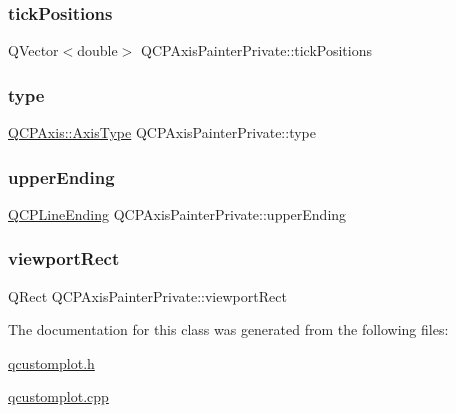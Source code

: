 \subsubsection{\texorpdfstring{tick\+Positions}{tickPositions}}
{\footnotesize\ttfamily Q\+Vector$<$double$>$ Q\+C\+P\+Axis\+Painter\+Private\+::tick\+Positions}

\mbox{\label{class_q_c_p_axis_painter_private_ae04594e97417336933d807c86d353098}} 
\subsubsection{\texorpdfstring{type}{type}}
{\footnotesize\ttfamily \hyperlink{class_q_c_p_axis_ae2bcc1728b382f10f064612b368bc18a}{Q\+C\+P\+Axis\+::\+Axis\+Type} Q\+C\+P\+Axis\+Painter\+Private\+::type}

\mbox{\label{class_q_c_p_axis_painter_private_af764be913be5f924700ac9bbb8c01139}} 
\subsubsection{\texorpdfstring{upper\+Ending}{upperEnding}}
{\footnotesize\ttfamily \hyperlink{class_q_c_p_line_ending}{Q\+C\+P\+Line\+Ending} Q\+C\+P\+Axis\+Painter\+Private\+::upper\+Ending}

\mbox{\label{class_q_c_p_axis_painter_private_a8627dc6b40781e3291bb508e4ac574d6}} 
\subsubsection{\texorpdfstring{viewport\+Rect}{viewportRect}}
{\footnotesize\ttfamily Q\+Rect Q\+C\+P\+Axis\+Painter\+Private\+::viewport\+Rect}



The documentation for this class was generated from the following files\+:\begin{DoxyCompactItemize}
\item 
\hyperlink{qcustomplot_8h}{qcustomplot.\+h}\item 
\hyperlink{qcustomplot_8cpp}{qcustomplot.\+cpp}\end{DoxyCompactItemize}
